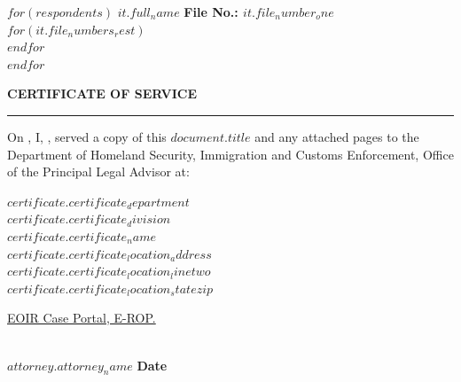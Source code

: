 \documentclass[12pt]{article}
\date{}
\begin{document}
$for(respondents)$
  \noindent
  \textbf{$it.full_name$} \hfill \textbf{File No.: $it.file_number_one$}
  $for(it.file_numbers_rest)$
    \\
  $endfor$
  \\
$endfor$

\vspace{2em}

\begin{center}
    {\Large \textbf{CERTIFICATE OF SERVICE}}\\
    \rule{0.65\textwidth}{0.6pt} %
\end{center}

\vspace{2em}

\justifying
\noindent On \uline{\hspace{3cm}}, I, \uline{\hspace{10cm}}, served a copy of this \uline{$document.title$} and any attached pages to the Department of Homeland Security, Immigration and Customs Enforcement, Office of the Principal Legal Advisor at:

\vspace{1em}

\begin{flushleft}  
  \hspace{2em} \uline{$certificate.certificate_department$}\\
  \hspace{2em} \uline{$certificate.certificate_division$}\\
  \hspace{2em} \uline{$certificate.certificate_name$}\\
  \hspace{2em} \uline{$certificate.certificate_location_address$}\\
  \hspace{2em} \uline{$certificate.certificate_location_linetwo$}\\
  \hspace{2em} \uline{$certificate.certificate_location_statezip$}
\end{flushleft}

\vspace{2em}

\noindent {} \underline{EOIR Case Portal, E-ROP.}

\vspace{4em}

\noindent\makebox[0.45\textwidth]{\hrulefill} \hfill \makebox[0.45\textwidth]{\hrulefill}\\
\noindent\textbf{$attorney.attorney_name$} \hfill \textbf{Date}
\end{document}
